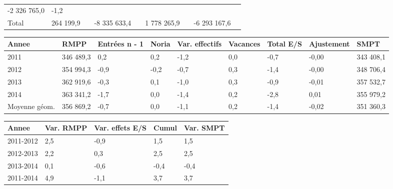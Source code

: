 \begin{longtable}[]{@{}lllllllll@{}}
\begin{minipage}[t]{0.10\columnwidth}
-2 326 765,0\strut
\end{minipage} & \begin{minipage}[t]{0.06\columnwidth}\raggedright
-1,2\strut
\end{minipage}\tabularnewline
\begin{minipage}[t]{0.05\columnwidth}\raggedright
Total\strut
\end{minipage} & \begin{minipage}[t]{0.10\columnwidth}\raggedright
264 199,9\strut
\end{minipage} & \begin{minipage}[t]{0.06\columnwidth}\raggedright
\strut
\end{minipage} & \begin{minipage}[t]{0.16\columnwidth}\raggedright
-8 335 633,4\strut
\end{minipage} & \begin{minipage}[t]{0.06\columnwidth}\raggedright
\strut
\end{minipage} & \begin{minipage}[t]{0.12\columnwidth}\raggedright
1 778 265,9\strut
\end{minipage} & \begin{minipage}[t]{0.06\columnwidth}\raggedright
\strut
\end{minipage} & \begin{minipage}[t]{0.10\columnwidth}\raggedright
-6 293 167,6\strut
\end{minipage} & \begin{minipage}[t]{0.06\columnwidth}\raggedright
\strut
\end{minipage}\tabularnewline
\bottomrule
\end{longtable}

\begin{longtable}[]{@{}lllllllll@{}}
\toprule
Annee & RMPP & Entrées n - 1 & Noria & Var. effectifs & Vacances & Total
E/S & Ajustement & SMPT\tabularnewline
\midrule
\endhead
2011 & 346 489,3 & 0,2 & 0,2 & -1,2 & 0,0 & -0,7 & -0,00 & 343
408,1\tabularnewline
2012 & 354 994,3 & -0,9 & -0,2 & -0,7 & 0,3 & -1,4 & -0,00 & 348
706,4\tabularnewline
2013 & 362 919,6 & -0,3 & 0,1 & -1,0 & 0,3 & -0,9 & -0,01 & 357
532,7\tabularnewline
2014 & 363 341,2 & -1,7 & 0,0 & -1,4 & 0,2 & -2,8 & 0,01 & 355
979,2\tabularnewline
Moyenne géom. & 356 869,2 & -0,7 & 0,0 & -1,1 & 0,2 & -1,4 & -0,02 & 351
360,3\tabularnewline
\bottomrule
\end{longtable}

\begin{longtable}[]{@{}lllll@{}}
\toprule
Annee & Var. RMPP & Var. effets E/S & Cumul & Var. SMPT\tabularnewline
\midrule
\endhead
2011-2012 & 2,5 & -0,9 & 1,5 & 1,5\tabularnewline
2012-2013 & 2,2 & 0,3 & 2,5 & 2,5\tabularnewline
2013-2014 & 0,1 & -0,6 & -0,4 & -0,4\tabularnewline
2011-2014 & 4,9 & -1,1 & 3,7 & 3,7\tabularnewline
\bottomrule
\end{longtable}

